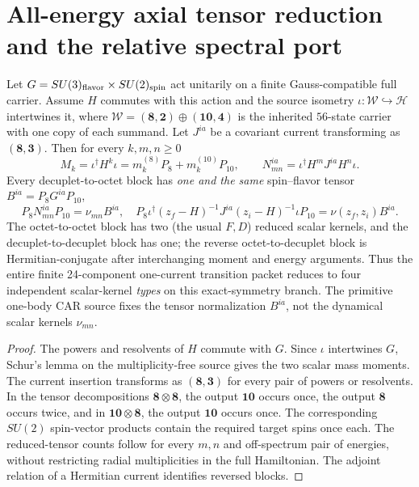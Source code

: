 \documentclass[12pt,a4paper]{article}
\begin{document}
\section{All-energy axial tensor reduction and the relative spectral port}
\label{p11:sec:v376-symmetry-moment-port}
\begin{theorem}
\label{p11:thm:v376-all-energy-axial-moment-factorization}
Let $G=SU(3)_{\rm flavor}\times SU(2)_{\rm spin}$ act unitarily
on a finite Gauss-compatible full carrier. Assume $H$ commutes
with this action and the source isometry
$\iota:\mathcal W\hookrightarrow\mathcal H$ intertwines it,
where
$\mathcal W=(\mathbf8,\mathbf2)\oplus(\mathbf{10},\mathbf4)$
is the inherited $56$-state carrier with one copy of each summand.
Let $J^{ia}$ be a covariant current transforming as
$(\mathbf8,\mathbf3)$. Then for every $k,m,n\ge0$
\[
 \boxed{M_k=\iota^\dagger H^k\iota
 =m_k^{(8)}P_8+m_k^{(10)}P_{10},}
 \qquad
 N_{mn}^{ia}=\iota^\dagger H^mJ^{ia}H^n\iota.
\]
Every decuplet-to-octet block has \emph{one and the same}
spin--flavor tensor $B^{ia}=P_8G^{ia}P_{10}$,
\[
 \boxed{P_8N_{mn}^{ia}P_{10}=\nu_{mn}B^{ia},\quad
 P_8\iota^\dagger(z_f-H)^{-1}J^{ia}(z_i-H)^{-1}
 \iota P_{10}=\nu(z_f,z_i)B^{ia}.}
\]
The octet-to-octet block has two (the usual $F,D$) reduced
scalar kernels, and the decuplet-to-decuplet block has one;
the reverse octet-to-decuplet block is Hermitian-conjugate after
interchanging moment and energy arguments. Thus the entire finite
24-component one-current transition packet reduces to four
independent scalar-kernel \emph{types} on this exact-symmetry branch.
The primitive one-body CAR source fixes the tensor normalization
$B^{ia}$, not the dynamical scalar kernels $\nu_{mn}$.
\end{theorem}
\begin{proof}
The powers and resolvents of $H$ commute with $G$. Since
$\iota$ intertwines $G$, Schur's lemma on the multiplicity-free
source gives the two scalar mass moments. The current insertion
transforms as $(\mathbf8,\mathbf3)$ for every pair of powers
or resolvents. In the tensor decompositions
$\mathbf8\otimes\mathbf8$, the output $\mathbf{10}$ occurs
once, the output $\mathbf8$ occurs twice, and in
$\mathbf{10}\otimes\mathbf8$, the output $\mathbf{10}$ occurs
once. The corresponding $SU(2)$ spin-vector products contain
the required target spins once each. The reduced-tensor counts
follow for every $m,n$ and off-spectrum pair of energies, without
restricting radial multiplicities in the full Hamiltonian. The
adjoint relation of a Hermitian current identifies reversed blocks.
\end{proof}
\end{document}
